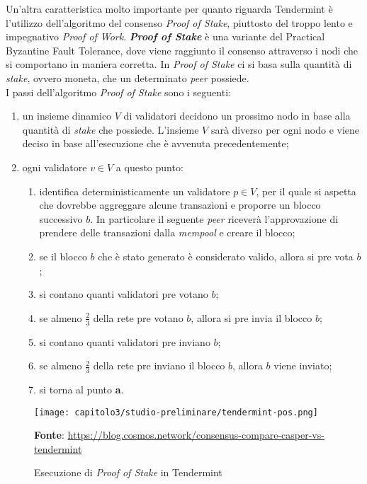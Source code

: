 Un'altra caratteristica molto importante per quanto riguarda Tendermint è l'utilizzo dell'algoritmo del consenso \textit{Proof of Stake}, piuttosto del troppo lento e impegnativo \textit{Proof of Work}.
\textbf{\textit{Proof of Stake}} è una variante del \gls{Practical Byzantine Fault Tolerance}, dove viene raggiunto il consenso attraverso i nodi che si comportano in maniera corretta. In \textit{Proof of Stake} ci si basa sulla quantità di \textit{stake}, ovvero moneta, che un determinato \textit{peer} possiede. \\

\noindent I passi dell'algoritmo \textit{Proof of Stake} sono i seguenti:
\begin{enumerate}[label=\lett]
  \item un insieme dinamico \( V \) di validatori decidono un prossimo nodo in base alla quantità di \textit{stake} che possiede. L'insieme \( V \) sarà diverso per ogni nodo e viene deciso in base all'esecuzione che è avvenuta precedentemente;
  \item ogni validatore \( v \in V \) a questo punto:
  \begin{enumerate}[label=\arabic*.]
    \item identifica deterministicamente un validatore \( p \in V \), per il quale si aspetta che dovrebbe aggreggare alcune transazioni e proporre un blocco successivo \( b \). In particolare il seguente \textit{peer} riceverà l'approvazione di prendere delle transazioni dalla \textit{mempool} e creare il blocco;
    \item se il blocco \( b \) che è stato generato è considerato valido, allora si pre vota \( b \);
    \item si contano quanti validatori pre votano \( b \);
    \item se almeno \( \frac{2}{3} \) della rete pre votano \( b \), allora si pre invia il blocco \( b \);
    \item si contano quanti validatori pre inviano \( b \);
    \item se almeno \( \frac{2}{3} \) della rete pre inviano il blocco \( b \), allora \( b \) viene inviato;
    \item si torna al punto \textbf{a}.
  \end{enumerate}
\end{enumerate}

\clearpage
\begin{figure}[h!]
  \centering
  \texttt{[image: capitolo3/studio-preliminare/tendermint-pos.png]}
  \caption{Esecuzione di \textit{Proof of Stake} in Tendermint}
  \textbf{Fonte}: \href{https://blog.cosmos.network/consensus-compare-casper-vs-tendermint-6df154ad56ae}{https://blog.cosmos.network/consensus-compare-casper-vs-tendermint}
\end{figure}

